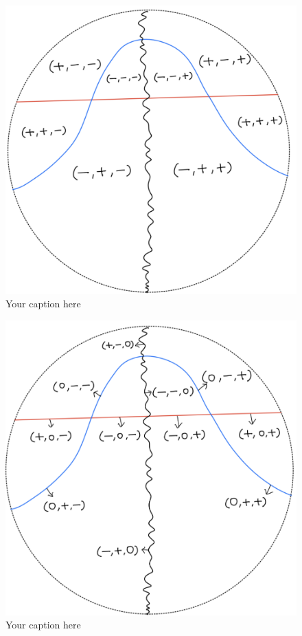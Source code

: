 \begin{figure}[H] 
    \centering
    \includegraphics[scale = 0.95]{diagrams/lemma3/1.png} 
    \caption{Your caption here}
    \label{fig:your-label}
\end{figure}


\begin{figure}[H] 
    \centering
    \includegraphics[scale = 0.95]{diagrams/lemma3/2.png} 
    \caption{Your caption here}
    \label{fig:your-label}
\end{figure}